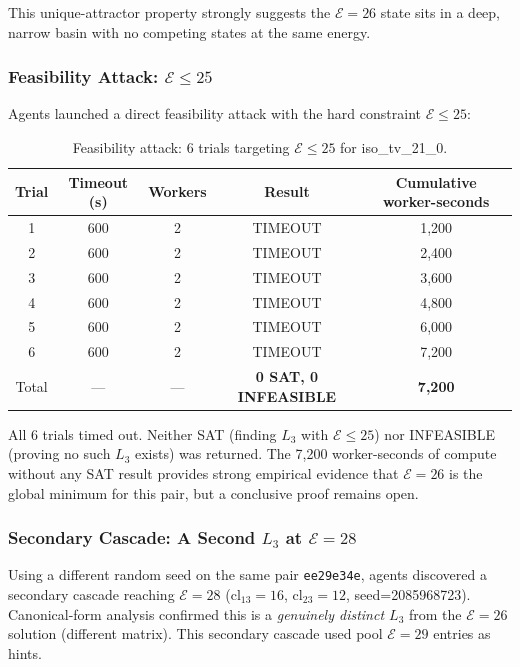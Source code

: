 \documentclass[11pt,a4paper]{article}
\theoremstyle{remark}
\newcommand{\cl}{\mathrm{cl}}
\newcommand{\E}{\mathcal{E}}
\begin{document}
This unique-attractor property strongly suggests the $\E=26$ state sits in a deep, narrow
basin with no competing states at the same energy.

\subsubsection{Feasibility Attack: $\E \leq 25$}

Agents launched a direct feasibility attack with the hard constraint $\E \leq 25$:

\begin{table}[h]
\centering
\caption{Feasibility attack: 6 trials targeting $\E \leq 25$ for iso\_tv\_21\_0.}\label{tab:feasibility}
\begin{tabular}{ccccc}
\toprule
Trial & Timeout (s) & Workers & Result & Cumulative worker-seconds\\
\midrule
1 & 600 & 2 & TIMEOUT & 1{,}200\\
2 & 600 & 2 & TIMEOUT & 2{,}400\\
3 & 600 & 2 & TIMEOUT & 3{,}600\\
4 & 600 & 2 & TIMEOUT & 4{,}800\\
5 & 600 & 2 & TIMEOUT & 6{,}000\\
6 & 600 & 2 & TIMEOUT & 7{,}200\\
\midrule
Total & --- & --- & \textbf{0 SAT, 0 INFEASIBLE} & \textbf{7{,}200}\\
\bottomrule
\end{tabular}
\end{table}

All 6 trials timed out. Neither SAT (finding $L_3$ with $\E \leq 25$) nor INFEASIBLE
(proving no such $L_3$ exists) was returned. The 7,200 worker-seconds of compute without
any SAT result provides strong empirical evidence that $\E=26$ is the global minimum for
this pair, but a conclusive proof remains open.

\subsubsection{Secondary Cascade: A Second $L_3$ at $\E=28$}

Using a different random seed on the same pair \texttt{ee29e34e}, agents discovered a
secondary cascade reaching $\E=28$ ($\cl_{13}=16$, $\cl_{23}=12$, seed=2085968723).
Canonical-form analysis confirmed this is a \emph{genuinely distinct $L_3$} from the
$\E=26$ solution (different matrix). This secondary cascade used pool $\E=29$ entries as
hints.
\end{document}
